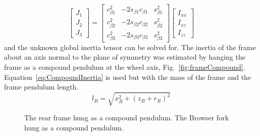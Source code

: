 \documentclass{bmd2010p}
\begin{document}
\begin{equation}
	\left[
	\begin{array}{c}
		J_{1}\\
		J_{2}\\
		J_{3}
	\end{array}
	\right]
	=
	\left[
	\begin{array}{ccc}
		c_{\beta 1}^2 & -2s_{\beta 1}c_{\beta 1} & s_{\beta 1}^2\\
		c_{\beta 2}^2 & -2s_{\beta 2}c_{\beta 2} & s_{\beta 2}^2\\
		c_{\beta 3}^2 & -2s_{\beta 3}c_{\beta 3} & s_{\beta 3}^2
	\end{array}
	\right]
	\left[
	\begin{array}{c}
		I_{xx}\\
		I_{xz}\\
		I_{zz}
	\end{array}
	\right]
\label{eq:inRel}
\end{equation}
and the unknown global inertia tensor can be solved for.
The inertia of the frame about an axis normal to the plane of symmetry was
estimated by hanging the frame as a compound pendulum at the wheel axis,
Fig.~\ref{fig:frameCompound}. Equation~\ref{eq:CompoundInertia} is used but
with the mass of the frame and the frame pendulum length.
\begin{equation}
    l_B=\sqrt{x_B^2+(z_B+r_R)^2}
    \label{eq:FramePendLength}
\end{equation}
\begin{figure}[tbp]
    \centering
        \caption{ The rear frame hung as a compound
        pendulum.  The Browser fork hung as a
        compound pendulum.}
        \label{fig:compound}
\end{figure}
\end{document}
